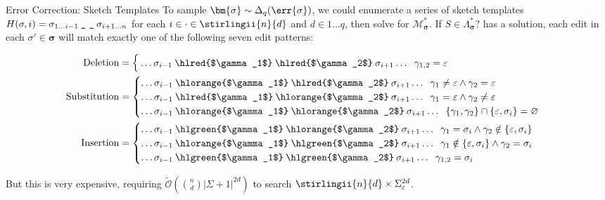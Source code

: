 \documentclass{beamer}
\begin{document}
\begin{frame}[fragile]{Error Correction: Sketch Templates}
  To sample $\bm{\sigma}\sim\Delta_{q}(\err{\sigma})$, we could enumerate a series of sketch templates $H(\sigma, i) = \sigma_{1\ldots i-1}\:\text{\texttt{\_} \texttt{\_}}\:\sigma_{i+1\ldots n}$ for each $i \in \cdot \in \stirlingii{n}{d}$ and $d \in 1\ldots q$, then solve for $\mathcal{M}_{\bm\sigma}^*$. If $S \in \Lambda^*_{\bm\sigma}?$ has a solution, each edit in each $\sigma' \in \bm\sigma$ will match exactly one of the following seven edit patterns:\vspace{-10pt}

  \begin{align*}
    \text{Deletion}&=\begin{cases}
                       \,\ldots\sigma_{i-1}\:\text{\hlred{$\gamma_1$}\:\hlred{$\gamma_2$}}\:\sigma_{i+1}\ldots\hspace{0.2cm}\gamma_{1, 2} = \varepsilon\label{eq:del}
    \end{cases}\\
    \text{Substitution}&=\begin{cases}
                           \ldots\sigma_{i-1}\:\text{\hlorange{$\gamma_1$}\:\hlred{$\gamma_2$}}\:\sigma_{i+1}\ldots\hspace{0.2cm}\gamma_1 \neq \varepsilon \land \gamma_2 = \varepsilon\\
                           \ldots\sigma_{i-1}\:\text{\hlred{$\gamma_1$}\:\hlorange{$\gamma_2$}}\:\sigma_{i+1}\ldots\hspace{0.2cm}\gamma_1 = \varepsilon \land \gamma_2 \neq \varepsilon\\
                           \ldots\sigma_{i-1}\:\text{\hlorange{$\gamma_1$}\:\hlorange{$\gamma_2$}}\:\sigma_{i+1}\ldots\hspace{0.2cm}\{\gamma_1, \gamma_2\}\cap\{\varepsilon, \sigma_i\} = \varnothing
    \end{cases}\\
    \text{Insertion}&=\begin{cases}
                        \ldots\sigma_{i-1}\:\text{\hlgreen{$\gamma_1$}\:\hlorange{$\gamma_2$}}\:\sigma_{i+1}\ldots\hspace{0.2cm}\gamma_1 = \sigma_i \land \gamma_2 \notin \{\varepsilon,  \sigma_i\}\label{eq:ins2}\\
                        \ldots\sigma_{i-1}\:\text{\hlorange{$\gamma_1$}\:\hlgreen{$\gamma_2$}}\:\sigma_{i+1}\ldots\hspace{0.2cm}\gamma_1 \notin \{\varepsilon, \sigma_i\} \land \gamma_2 = \sigma_i\label{eq:ins1}\\
                        \ldots\sigma_{i-1}\:\text{\hlgreen{$\gamma_1$}\:\hlgreen{$\gamma_2$}}\:\sigma_{i+1}\ldots\hspace{0.2cm}\gamma_{1,2} = \sigma_i\label{eq:copy}
    \end{cases}
  \end{align*}

  But this is very expensive, requiring $\widetilde{\mathcal O}\left({n \choose d}|\Sigma + 1|^{2d}\right)$ to search $\stirlingii{n}{d}\times\Sigma_\varepsilon^{2d}$.
\end{frame}
\end{document}

